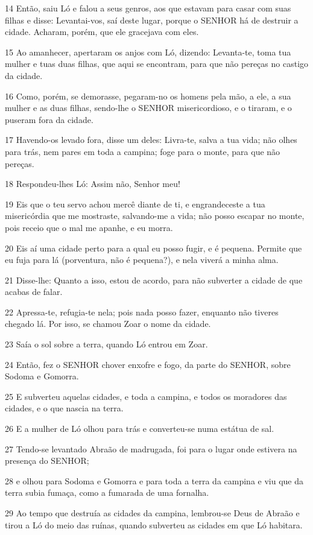 \par 14 Então, saiu Ló e falou a seus genros, aos que estavam para casar com suas filhas e disse: Levantai-vos, saí deste lugar, porque o SENHOR há de destruir a cidade. Acharam, porém, que ele gracejava com eles.
\par 15 Ao amanhecer, apertaram os anjos com Ló, dizendo: Levanta-te, toma tua mulher e tuas duas filhas, que aqui se encontram, para que não pereças no castigo da cidade.
\par 16 Como, porém, se demorasse, pegaram-no os homens pela mão, a ele, a sua mulher e as duas filhas, sendo-lhe o SENHOR misericordioso, e o tiraram, e o puseram fora da cidade.
\par 17 Havendo-os levado fora, disse um deles: Livra-te, salva a tua vida; não olhes para trás, nem pares em toda a campina; foge para o monte, para que não pereças.
\par 18 Respondeu-lhes Ló: Assim não, Senhor meu!
\par 19 Eis que o teu servo achou mercê diante de ti, e engrandeceste a tua misericórdia que me mostraste, salvando-me a vida; não posso escapar no monte, pois receio que o mal me apanhe, e eu morra.
\par 20 Eis aí uma cidade perto para a qual eu posso fugir, e é pequena. Permite que eu fuja para lá (porventura, não é pequena?), e nela viverá a minha alma.
\par 21 Disse-lhe: Quanto a isso, estou de acordo, para não subverter a cidade de que acabas de falar.
\par 22 Apressa-te, refugia-te nela; pois nada posso fazer, enquanto não tiveres chegado lá. Por isso, se chamou Zoar o nome da cidade.
\par 23 Saía o sol sobre a terra, quando Ló entrou em Zoar.
\par 24 Então, fez o SENHOR chover enxofre e fogo, da parte do SENHOR, sobre Sodoma e Gomorra.
\par 25 E subverteu aquelas cidades, e toda a campina, e todos os moradores das cidades, e o que nascia na terra.
\par 26 E a mulher de Ló olhou para trás e converteu-se numa estátua de sal.
\par 27 Tendo-se levantado Abraão de madrugada, foi para o lugar onde estivera na presença do SENHOR;
\par 28 e olhou para Sodoma e Gomorra e para toda a terra da campina e viu que da terra subia fumaça, como a fumarada de uma fornalha.
\par 29 Ao tempo que destruía as cidades da campina, lembrou-se Deus de Abraão e tirou a Ló do meio das ruínas, quando subverteu as cidades em que Ló habitara.

